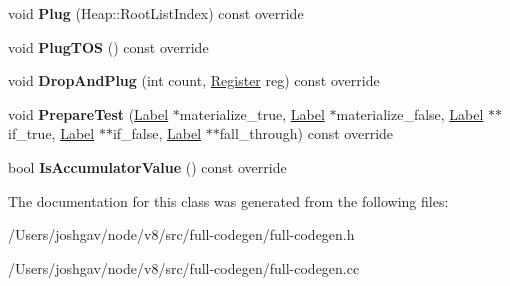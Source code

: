 \begin{DoxyCompactItemize}
\item 
void {\bfseries Plug} (Heap\+::\+Root\+List\+Index) const  override\hypertarget{classv8_1_1internal_1_1_full_code_generator_1_1_accumulator_value_context_a589c763fbb18e59f9f44bf335333775e}{}\label{classv8_1_1internal_1_1_full_code_generator_1_1_accumulator_value_context_a589c763fbb18e59f9f44bf335333775e}

\item 
void {\bfseries Plug\+T\+OS} () const  override\hypertarget{classv8_1_1internal_1_1_full_code_generator_1_1_accumulator_value_context_a7710c8085856e8a8f45031ac9e6d0502}{}\label{classv8_1_1internal_1_1_full_code_generator_1_1_accumulator_value_context_a7710c8085856e8a8f45031ac9e6d0502}

\item 
void {\bfseries Drop\+And\+Plug} (int count, \hyperlink{structv8_1_1internal_1_1_register}{Register} reg) const  override\hypertarget{classv8_1_1internal_1_1_full_code_generator_1_1_accumulator_value_context_a809be7887775f63549ee281dbafccb4f}{}\label{classv8_1_1internal_1_1_full_code_generator_1_1_accumulator_value_context_a809be7887775f63549ee281dbafccb4f}

\item 
void {\bfseries Prepare\+Test} (\hyperlink{classv8_1_1internal_1_1_label}{Label} $\ast$materialize\+\_\+true, \hyperlink{classv8_1_1internal_1_1_label}{Label} $\ast$materialize\+\_\+false, \hyperlink{classv8_1_1internal_1_1_label}{Label} $\ast$$\ast$if\+\_\+true, \hyperlink{classv8_1_1internal_1_1_label}{Label} $\ast$$\ast$if\+\_\+false, \hyperlink{classv8_1_1internal_1_1_label}{Label} $\ast$$\ast$fall\+\_\+through) const  override\hypertarget{classv8_1_1internal_1_1_full_code_generator_1_1_accumulator_value_context_a3b64159d3356198a2ce1767cabe3d32b}{}\label{classv8_1_1internal_1_1_full_code_generator_1_1_accumulator_value_context_a3b64159d3356198a2ce1767cabe3d32b}

\item 
bool {\bfseries Is\+Accumulator\+Value} () const  override\hypertarget{classv8_1_1internal_1_1_full_code_generator_1_1_accumulator_value_context_aae0528cd170cdfd2190c40e983df7332}{}\label{classv8_1_1internal_1_1_full_code_generator_1_1_accumulator_value_context_aae0528cd170cdfd2190c40e983df7332}

\end{DoxyCompactItemize}


The documentation for this class was generated from the following files\+:\begin{DoxyCompactItemize}
\item 
/\+Users/joshgav/node/v8/src/full-\/codegen/full-\/codegen.\+h\item 
/\+Users/joshgav/node/v8/src/full-\/codegen/full-\/codegen.\+cc\end{DoxyCompactItemize}
